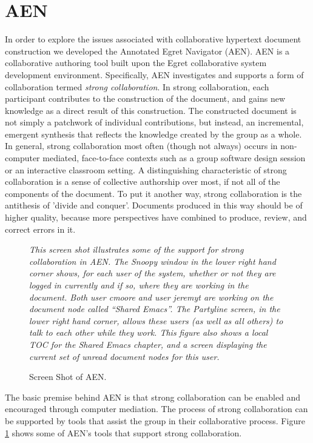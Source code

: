 \section{AEN}

In order to explore the issues associated with collaborative hypertext
document construction we developed the Annotated Egret Navigator (AEN). AEN
is a collaborative authoring tool built upon the Egret \cite{csdl-93-09}
collaborative system development environment.  Specifically, AEN
investigates and supports a form of collaboration termed {\em strong
collaboration}.  In strong collaboration, each participant contributes to
the construction of the document, and gains new knowledge as a direct
result of this construction.  The constructed document is not simply a
patchwork of individual contributions, but instead, an incremental,
emergent synthesis that reflects the knowledge created by the group as a
whole.  In general, strong collaboration most often (though not always)
occurs in non-computer mediated, face-to-face contexts such as a group
software design session or an interactive classroom setting.  A
distinguishing characteristic of strong collaboration is a sense of
collective authorship over most, if not all of the components of the
document.  To put it another way, strong collaboration is the antithesis of
'divide and conquer'.  Documents produced in this way should be of higher
quality, because more perspectives have combined to produce, review, and
correct errors in it.

\begin{figure}%
  \centerline{} 
  {\em This screen shot illustrates some of the support for strong
  collaboration in AEN.  The Snoopy window in the lower right hand corner
  shows, for each user of the system, whether or not they are logged in
  currently and if so, where they are working in the document.  Both user
  cmoore and user jeremyt are working on the document node called
  ``Shared Emacs''.  The Partyline screen, in the lower right hand
  corner, allows these users (as well as all others) to talk to each
  other while they work.  This figure also shows a local TOC for the
  Shared Emacs chapter, and a screen displaying the current set of unread
  document nodes for this user.}
 \caption{Screen Shot of AEN.}
 \label{fig:Screen2}
\end{figure}

The basic premise behind AEN is that strong collaboration can be
enabled and encouraged through computer mediation.  The process of strong
collaboration can be supported by tools that assist the group in their
collaborative process.  Figure \ref{fig:Screen2} shows some of AEN's tools
that support strong collaboration.

